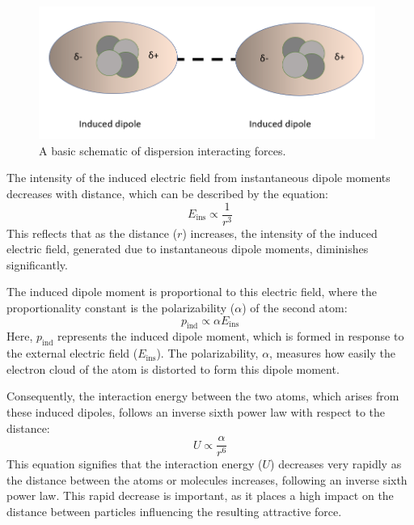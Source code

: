 \begin{figure}[h!]     %
        \begin{center}
          \includegraphics[width=110mm]{chapter1/London.PNG}
\end{center}
\caption{A basic schematic of dispersion interacting forces.}
\label{fig:dispy}                 %
\end{figure}

The intensity of the induced electric field from instantaneous dipole moments decreases with distance, which can be described by the equation:
\begin{equation}
E_{\text{ins}} \propto \frac{1}{r^3}
\end{equation}
This reflects that as the distance (\(r\)) increases, the intensity of the induced electric field, generated due to instantaneous dipole moments, diminishes significantly.

The induced dipole moment is proportional to this electric field, where the proportionality constant is the polarizability (\(\alpha\)) of the second atom:
\begin{equation}
p_{\text{ind}} \propto \alpha E_{\text{ins}}
\end{equation}
Here, \(p_{\text{ind}}\) represents the induced dipole moment, which is formed in response to the external electric field (\(E_{\text{ins}}\)). The polarizability, \(\alpha\), measures how easily the electron cloud of the atom is distorted to form this dipole moment.

Consequently, the interaction energy between the two atoms, which arises from these induced dipoles, follows an inverse sixth power law with respect to the distance:
\begin{equation}
U \propto \frac{\alpha}{r^6}
\end{equation}
This equation signifies that the interaction energy (\(U\)) decreases very rapidly as the distance between the atoms or molecules increases, following an inverse sixth power law. This rapid decrease is important, as it places a high impact on the distance between particles influencing the resulting attractive force.

